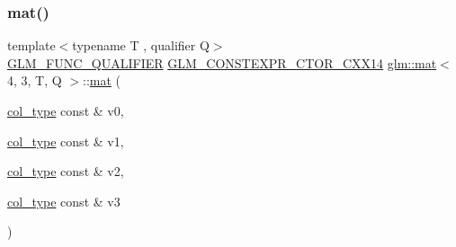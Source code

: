 \subsubsection{\texorpdfstring{mat()}{mat()}\hspace{0.1cm}{\footnotesize\ttfamily [6/21]}}
{\footnotesize\ttfamily template$<$typename T , qualifier Q$>$ \\
\hyperlink{setup_8hpp_a33fdea6f91c5f834105f7415e2a64407}{G\+L\+M\+\_\+\+F\+U\+N\+C\+\_\+\+Q\+U\+A\+L\+I\+F\+I\+ER} \hyperlink{setup_8hpp_a0900f9145e68bf6061b6f5e7be3fa751}{G\+L\+M\+\_\+\+C\+O\+N\+S\+T\+E\+X\+P\+R\+\_\+\+C\+T\+O\+R\+\_\+\+C\+X\+X14} \hyperlink{structglm_1_1mat}{glm\+::mat}$<$ 4, 3, T, Q $>$\+::\hyperlink{structglm_1_1mat}{mat} (\begin{DoxyParamCaption}\item[{\hyperlink{structglm_1_1mat_3_014_00_013_00_01_t_00_01_q_01_4_ab7cb76d6290691108c8af724270e3b6c}{col\+\_\+type} const \&}]{v0,  }\item[{\hyperlink{structglm_1_1mat_3_014_00_013_00_01_t_00_01_q_01_4_ab7cb76d6290691108c8af724270e3b6c}{col\+\_\+type} const \&}]{v1,  }\item[{\hyperlink{structglm_1_1mat_3_014_00_013_00_01_t_00_01_q_01_4_ab7cb76d6290691108c8af724270e3b6c}{col\+\_\+type} const \&}]{v2,  }\item[{\hyperlink{structglm_1_1mat_3_014_00_013_00_01_t_00_01_q_01_4_ab7cb76d6290691108c8af724270e3b6c}{col\+\_\+type} const \&}]{v3 }\end{DoxyParamCaption})}

\mbox{\label{structglm_1_1mat_3_014_00_013_00_01_t_00_01_q_01_4_a7ced48f5154c33ac14f3af5771e73446}} 
